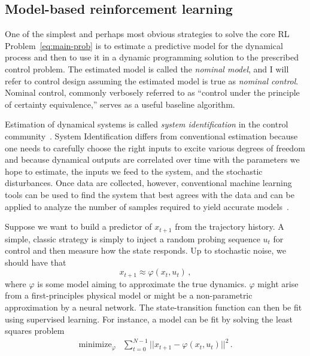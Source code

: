 \documentclass[11pt]{article}
\newcommand{\eqd}[1]{\eqref{eq:#1}}
\numberwithin{equation}{section}
\begin{document}
\subsection{Model-based reinforcement learning} 

One of the simplest and perhaps most obvious strategies to solve the core RL Problem~\eqd{main-prob} is to estimate a predictive model for the dynamical process and then to use it in a dynamic programming solution to the prescribed control problem. The estimated model is called the \emph{nominal model}, and I will refer to control design assuming the estimated model is true as \emph{nominal control}. Nominal control, commonly verbosely referred to as ``control under the principle of certainty equivalence,'' serves as a useful baseline algorithm. 

Estimation of dynamical systems is called  \emph{system identification} in the control community~\cite{LjungBook}. System Identification differs from conventional estimation because one needs to carefully choose the right inputs to excite  various degrees of freedom and because dynamical outputs are correlated over time with the parameters we hope to estimate, the inputs we feed to the system, and the stochastic disturbances. Once data are collected, however, conventional machine learning tools can be used to find the system that best agrees with the data and can be applied to analyze the number of samples required to yield accurate models~\cite{campi2002finite,vidyasagar2008learning}.

Suppose we want to build a predictor of $x_{t+1}$ from the trajectory history. A simple, classic strategy is simply to inject a random probing sequence $u_t$ for control and then measure how the state responds.  Up to stochastic noise, we should have that
\begin{equation}\label{eq:sys-id}
	x_{t+1} \approx \varphi(x_t,u_t) \,,
\end{equation}
where $\varphi$ is some model aiming to approximate the true dynamics. $\varphi$ might arise from a first-principles physical model or might be a non-parametric approximation by a neural network. The state-transition function can then be fit using supervised learning. For instance, a model can be fit by solving the least squares problem
\begin{equation*}
\begin{array}{ll}
\mbox{minimize}_{\varphi} & \sum_{t=0}^{N-1} ||x_{t+1} - \varphi(x_t,u_t)||^2\,.
\end{array}
\end{equation*}
\end{document}
